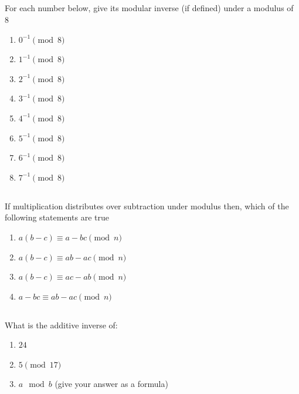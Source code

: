 \documentclass[twocolumn]{article}
\newcommand\mrk[1]{}
\begin{document}
\subsection{}

    For each number below, give its modular inverse (if defined) under a modulus of 8

    \begin{multicols}{2}
    \begin{enumerate}
        \item $ 0^{-1} \pmod{8} $ \mrk{1}
        \item $ 1^{-1} \pmod{8} $ \mrk{1}
        \item $ 2^{-1} \pmod{8} $ \mrk{1}
        \item $ 3^{-1} \pmod{8} $ \mrk{1}
        \item $ 4^{-1} \pmod{8} $ \mrk{1}
        \item $ 5^{-1} \pmod{8} $ \mrk{1}
        \item $ 6^{-1} \pmod{8} $ \mrk{1}
        \item $ 7^{-1} \pmod{8} $ \mrk{1}
    \end{enumerate}
\end{multicols}

\subsection{}

    If multiplication distributes over subtraction under modulus then, which of the following statements are true \mrk{1}

    \begin{enumerate}
        \item $a ( b - c ) \equiv a - bc \pmod{n} $
        \item $a ( b - c ) \equiv ab - ac \pmod{n} $
        \item $a ( b - c ) \equiv ac - ab \pmod{n} $
        \item $a - bc \equiv ab - ac \pmod{n} $
    \end{enumerate}

\subsection{}

    What is the additive inverse of:

    \begin{enumerate}
        \item $24$ \mrk{1}
        \item $5 \pmod{17}$ \mrk{1}
        \item $a \mod b$ (give your answer as a formula) \mrk{1}
    \end{enumerate}
\end{document}

